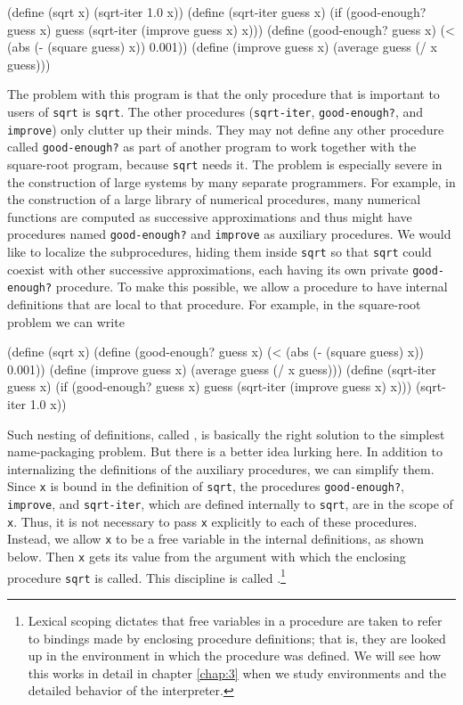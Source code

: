 \begin{schemedisplay}
\begin{schemedisplay}
(define (sqrt x)
  (sqrt-iter 1.0 x))
(define (sqrt-iter guess x)
  (if (good-enough? guess x)
      guess
      (sqrt-iter (improve guess x) x)))
(define (good-enough? guess x)
  (< (abs (- (square guess) x)) 0.001))
(define (improve guess x)
  (average guess (/ x guess)))
\end{schemedisplay}

The problem with this program is that the only procedure that is
important to users of \texttt{sqrt} is \texttt{sqrt}.  The other
procedures (\texttt{sqrt-iter}, \texttt{good-enough?}, and
\texttt{improve}) only clutter up their minds.  They may not define
any other procedure called \texttt{good-enough?} as part of another
program to work together with the square-root program, because
\texttt{sqrt} needs it.  The problem is especially severe in the
construction of large systems by many separate programmers.  For
example, in the construction of a large library of numerical
procedures, many numerical functions are computed as successive
approximations and thus might have procedures named
\texttt{good-enough?} and \texttt{improve} as auxiliary procedures.
We would like to localize the subprocedures, hiding them inside
\texttt{sqrt} so that \texttt{sqrt} could coexist with other
successive approximations, each having its own private
\texttt{good-enough?} procedure.  To make this possible, we allow a
procedure to have internal definitions that are local to that
procedure.  For example, in the square-root problem we can write

\begin{schemedisplay}
(define (sqrt x)
  (define (good-enough? guess x)
    (< (abs (- (square guess) x)) 0.001))
  (define (improve guess x)
    (average guess (/ x guess)))
  (define (sqrt-iter guess x)
    (if (good-enough? guess x)
        guess
        (sqrt-iter (improve guess x) x)))
  (sqrt-iter 1.0 x))
\end{schemedisplay}

Such nesting of definitions, called ,
is basically the right solution to the simplest 
name-packaging problem.  But there is a better idea lurking here.  In
addition to internalizing the definitions of the auxiliary procedures,
we can simplify them.  Since \texttt{x} is bound in the definition of
\texttt{sqrt}, the procedures \texttt{good-enough?}, \texttt{improve}, and
\texttt{sqrt-iter}, which are defined internally to \texttt{sqrt}, are in the
scope of \texttt{x}.  Thus, it is not necessary to pass \texttt{x} explicitly to
each of these procedures.  Instead, we allow \texttt{x} to be a free
variable in the internal definitions, as shown below. Then \texttt{x}
gets its value from the argument with which the enclosing
procedure \texttt{sqrt} is called.  This discipline is called .\footnote{Lexical
scoping dictates that free variables in a procedure are taken to refer to
bindings made by enclosing procedure definitions;
that is, they are looked up in
the environment in which the procedure was defined.  We will see how
this works in detail in chapter \ref{chap:3} when we study environments and the
detailed behavior of the interpreter.}


\end{schemedisplay}
